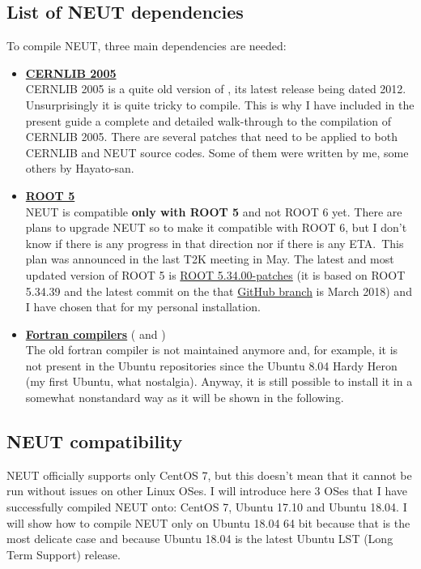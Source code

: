 \subsection{List of NEUT dependencies}\label{dep}
To compile NEUT, three main dependencies are needed:
\begin{itemize}
\item \hyperref[sec:cernlib-2005]{\textbf{CERNLIB 2005}}\\
  CERNLIB 2005 is a quite old version of , its latest
  release being dated 2012. Unsurprisingly it is quite tricky to compile. This
  is why I have included in the present guide a complete and detailed
  walk-through to the compilation of CERNLIB 2005. There are several patches
  that need to be applied to both CERNLIB and NEUT source codes. Some of them
  were written by me, some others by Hayato-san.
\item \hyperref[root5]{\textbf{ROOT 5}}\\
  NEUT is compatible \textbf{only with ROOT 5} and not ROOT 6 yet. There are
  plans to upgrade NEUT so to make it compatible with ROOT 6, but I don't know
  if there is any progress in that direction nor if there is any ETA.\ This plan
  was announced in the last T2K meeting in May. The latest and most updated
  version of ROOT 5 is
  \href{https://github.com/root-project/root/tree/v5-34-00-patches?files=1}{ROOT
    5.34.00-patches} (it is based on ROOT 5.34.39 and the latest commit on the
  that
  \href{https://github.com/root-project/root/tree/v5-34-00-patches?files=1}{GitHub
    branch} is March 2018) and I have chosen that for my personal installation.
\item \hyperref[compiler]{\textbf{Fortran compilers}} ( and
  )\\
  The old fortran compiler  is not maintained anymore and, for
  example, it is not present in the Ubuntu repositories since the Ubuntu 8.04
  Hardy Heron (my first Ubuntu, what nostalgia). Anyway, it is still possible to
  install it in a somewhat nonstandard way as it will be shown in the following.
\end{itemize}

\subsection{NEUT compatibility}
NEUT officially supports only CentOS 7, but this doesn't mean that it cannot be
run without issues on other Linux OSes. I will introduce here 3 OSes that I have
successfully compiled NEUT onto: CentOS 7, Ubuntu 17.10 and Ubuntu 18.04. I will
show how to compile NEUT only on Ubuntu 18.04 64 bit because that is the most
delicate case and because Ubuntu 18.04 is the latest Ubuntu LST (Long Term
Support) release.
